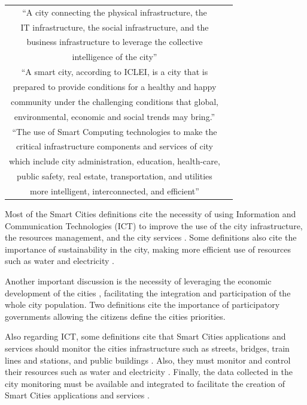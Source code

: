 \begin{table}
\begin{tabular}{c|c}
“A city connecting the physical infrastructure, the\\
IT infrastructure, the social infrastructure, and the\\
business infrastructure to leverage the collective\\
intelligence of the city”
& \citep{harrison2010foundations} \\\hline

“A smart city, according to ICLEI, is a city that is\\ 
prepared to provide conditions for a healthy and happy\\
community under the challenging conditions that global,\\
environmental, economic and social trends may bring.”  & \citep{guan2012smart} \\\hline

“The use of Smart Computing technologies to make the\\ 
critical infrastructure components and services of city\\
which include city administration, education, health-care,\\ 
public safety, real estate, transportation, and utilities\\
more intelligent, interconnected, and efficient”
& \citep{washburn2009helping} \\\hline

\end{tabular}
\end{table}

Most of the Smart Cities definitions cite the necessity of using Information and Communication Technologies (ICT) to improve the use of the city infrastructure, the resources management, and the city services \citep{harrison2010foundations,washburn2009helping}. Some definitions also cite the importance of sustainability in the city, making more efficient use of resources such as water and electricity \citep{caragliu2011smart,dameri2013searching}.

Another important discussion is the necessity of leveraging the economic development of the cities \citep{dameri2013searching}, facilitating the integration and participation of the whole city population. Two definitions \citep{dameri2013searching,giffinger2007smart} cite the importance of participatory governments allowing the citizens define the cities priorities.

Also regarding ICT, some definitions cite that Smart Cities applications and services should monitor the cities infrastructure such as streets, bridges, train lines and stations, and public buildings \citep{hall2000creative}. Also, they must monitor and control their resources such as water and electricity \citep{hall2000creative}. Finally, the data collected in the city monitoring must be available and integrated to facilitate the creation of Smart Cities applications and services \citep{harrison2010foundations,washburn2009helping}.

